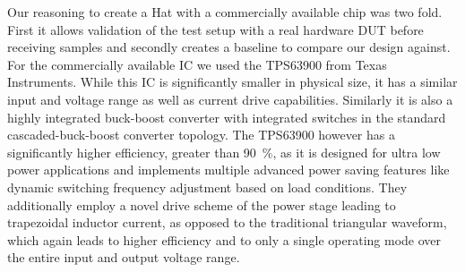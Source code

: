 Our reasoning to create a Hat with a commercially available chip was two fold. First it allows validation of the test setup with a real hardware \ac{DUT} before receiving samples and secondly creates a baseline to compare our design against. For the commercially available \ac{IC} we used the TPS63900 from Texas Instruments. While this \ac{IC} is significantly smaller in physical size, it has a similar input and voltage range as well as current drive capabilities. Similarly it is also a highly integrated buck-boost converter with integrated switches in the standard cascaded-buck-boost converter topology. The TPS63900 however has a significantly higher efficiency, greater than \qty{90}{\percent}\cite{tps63900}, as it is designed for ultra low power applications and implements multiple advanced power saving features like dynamic switching frequency adjustment based on load conditions\cite{tps63900}. They additionally employ a novel drive scheme of the power stage leading to trapezoidal inductor current, as opposed to the traditional triangular waveform, which again leads to higher efficiency and to only a single operating mode over the entire input and output voltage range\cite{tps63900}. 